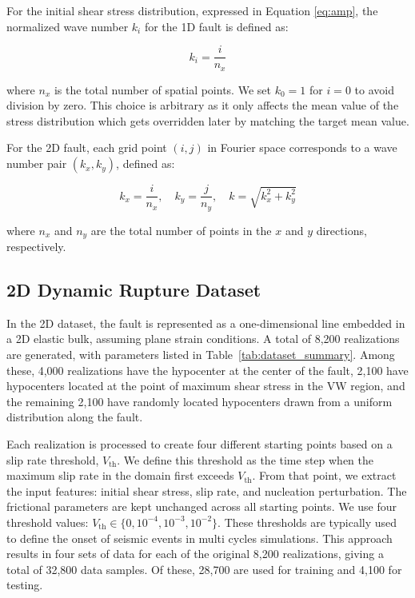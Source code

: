 \documentclass[draft]{agujournal2019}
\begin{document}
For the initial shear stress distribution, expressed in Equation \ref{eq:amp}, the normalized wave number \( k_i \) for the 1D fault is defined as:

\begin{equation}
\label{eqn:k_2D}
k_i = \frac{i}{n_x}
\end{equation}

where \( n_x \) is the total number of spatial points. We set \( k_0 = 1 \) for \( i = 0 \) to avoid division by zero. This choice is arbitrary as it only affects the mean value of the stress distribution which gets overridden later by matching the target mean value.

For the 2D fault, each grid point \( (i,j) \) in Fourier space corresponds to a wave number pair \( (k_x, k_y) \), defined as:

\begin{equation}
\label{eqn:k_3D}
k_x = \frac{i}{n_x}, \quad k_y = \frac{j}{n_y}, \quad
k = \sqrt{k_x^2 + k_y^2}
\end{equation}

where \( n_x \) and \( n_y \) are the total number of points in the \( x \) and \( y \) directions, respectively.


\subsection{2D Dynamic Rupture Dataset}
\label{sec:2d}

In the 2D dataset, the fault is represented as a one-dimensional line embedded in a 2D elastic bulk, assuming plane strain conditions. A total of 8,200 realizations are generated, with parameters listed in Table~\ref{tab:dataset_summary}. Among these, 4,000 realizations have the hypocenter at the center of the fault, 2,100 have hypocenters located at the point of maximum shear stress in the VW region, and the remaining 2,100 have randomly located hypocenters drawn from a uniform distribution along the fault. 

Each realization is processed to create four different starting points based on a slip rate threshold, \(V_\text{th}\). We define this threshold as the time step when the maximum slip rate in the domain first exceeds \(V_\text{th}\). From that point, we extract the input features: initial shear stress, slip rate, and nucleation perturbation. The frictional parameters are kept unchanged across all starting points. We use four threshold values: \(V_\text{th} \in \{0, 10^{-4}, 10^{-3}, 10^{-2}\}\). These thresholds are typically used to define the onset of seismic events in multi cycles simulations. This approach results in four sets of data for each of the original 8,200 realizations, giving a total of 32,800 data samples. Of these, 28,700 are used for training and 4,100 for testing.
\end{document}
